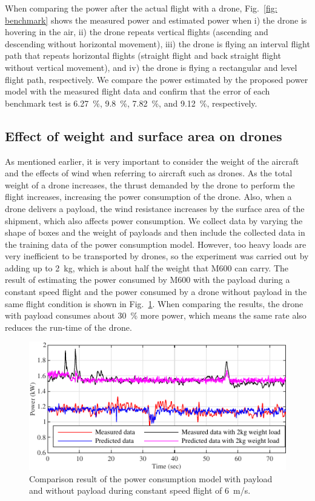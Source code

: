 \documentclass[journal]{./template/IEEEtran}
\begin{document}
When comparing the power after the actual flight with a drone, Fig.~\ref{fig: benchmark} shows the measured power and estimated power when i) the drone is hovering in the air, ii) the drone repeats vertical flights (ascending and descending without horizontal movement), iii) the drone is flying an interval flight path that repeats horizontal flights (straight flight and back straight flight without vertical movement), and iv) the drone is flying a rectangular and level flight path, respectively. 
We compare the power estimated by the proposed power model with the measured flight data and confirm that the error of each benchmark test is 6.27~\%, 9.8~\%, 7.82~\%, and 9.12~\%, respectively.



\subsection{Effect of weight and surface area on drones}
As mentioned earlier, it is very important to consider the weight of the aircraft and the effects of wind when referring to aircraft such as drones.
As the total weight of a drone increases, the thrust demanded by the drone to perform the flight increases, increasing the power consumption of the drone. 
Also, when a drone delivers a payload, the wind resistance increases by the surface area of the shipment, which also affects power consumption.
We collect data by varying the shape of boxes and the weight of payloads and then include the collected data in the training data of the power consumption model.
However, too heavy loads are very inefficient to be transported by drones, so the experiment was carried out by adding up to 2~kg, which is about half the weight that M600 can carry.
The result of estimating the power consumed by M600 with the payload during a constant speed flight and the power consumed by a drone without payload in the same flight condition is shown in Fig.~\ref{fig: Model_weight}. 
When comparing the results, the drone with payload consumes about 30~\% more power, which means  the same rate also reduces the run-time of the drone.

\begin{figure}[ht]
\centering\includegraphics[scale=1.0]{fig9/compare_weight8x4.pdf}
\caption{Comparison result of the power consumption model with payload and without payload during constant speed flight of 6~m/s.}
\label{fig: Model_weight}
\end{figure}
\end{document}

